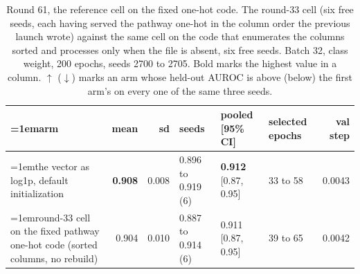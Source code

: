 \begin{table}[H]
  \centering
  \scriptsize
  \setlength{\tabcolsep}{2.5pt}
  \caption[Round 61, the reference cell on the fixed one-hot code]{Round 61, the reference cell on the fixed one-hot code. The round-33 cell (six free seeds, each having served the pathway one-hot in the column order the previous launch wrote) against the same cell on the code that enumerates the columns sorted and processes only when the file is absent, six free seeds. Batch 32, class weight, 200 epochs, seeds 2700 to 2705. Bold marks the highest value in a column. $\uparrow$ ($\downarrow$) marks an arm whose held-out AUROC is above (below) the first arm's on every one of the same three seeds.}
  \label{tab:w77}
  \begin{tabular}{@{}>{\raggedright\hangindent=1em\hangafter=1\arraybackslash}p{84.4mm}rrlllr@{}}
    \hline
    arm & mean & sd & seeds & pooled [95\% CI] & selected epochs & val step \\
    \hline
    the vector as log1p, default initialization & \textbf{0.908} & 0.008 & 0.896 to 0.919 (6) & \textbf{0.912} [0.87, 0.95] & 33 to 58 & 0.0043 \\
    round-33 cell on the fixed pathway one-hot code (sorted columns, no rebuild) & 0.904 & 0.010 & 0.887 to 0.914 (6) & 0.911 [0.87, 0.95] & 39 to 65 & 0.0042 \\
    \hline
  \end{tabular}
\end{table}
